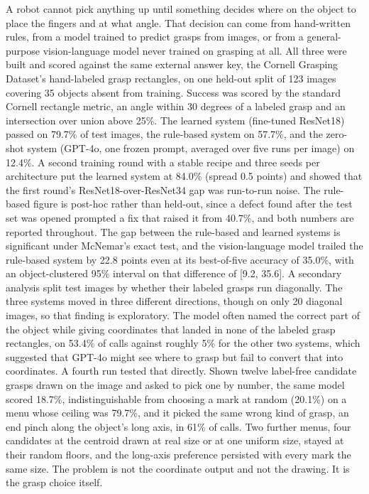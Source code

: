 \documentclass[12pt,letterpaper]{article}
\begin{document}
A robot cannot pick anything up until something decides where on the
object to place the fingers and at what angle. That decision can come
from hand-written rules, from a model trained to predict grasps from
images, or from a general-purpose vision-language model never trained
on grasping at all. All three were built and scored against the same
external answer key, the Cornell Grasping Dataset's hand-labeled grasp
rectangles, on one held-out split of 123 images covering 35 objects
absent from training. Success was scored by the standard Cornell
rectangle metric, an angle within 30 degrees of a labeled grasp and an
intersection over union above 25\%. The learned system (fine-tuned
ResNet18) passed on 79.7\% of test images, the rule-based system on
57.7\%, and the zero-shot system (GPT-4o, one frozen prompt, averaged
over five runs per image) on 12.4\%. A second training round with a
stable recipe and three seeds per architecture put the learned system
at 84.0\% (spread 0.5 points) and showed that the first round's
ResNet18-over-ResNet34 gap was run-to-run noise. The rule-based figure is post-hoc
rather than held-out, since a defect found after the test set was
opened prompted a fix that raised it from 40.7\%, and both numbers are
reported throughout. The gap between the rule-based and learned systems
is significant under McNemar's exact test, and the vision-language
model trailed the rule-based system by 22.8 points even at its
best-of-five accuracy of 35.0\%, with an object-clustered 95\% interval
on that difference of [9.2, 35.6]. A secondary
analysis split test images by whether their labeled grasps run
diagonally. The three systems moved in three different directions,
though on only 20 diagonal images, so that finding is exploratory. The
model often named the correct part of the object while giving
coordinates that landed in none of the labeled grasp rectangles, on
53.4\% of calls against roughly 5\% for the other two systems, which
suggested that GPT-4o might see where to grasp but fail to convert that
into coordinates. A fourth run tested that directly. Shown twelve
label-free candidate grasps drawn on the image and asked to pick one by
number, the same model scored 18.7\%, indistinguishable from choosing a
mark at random (20.1\%) on a menu whose ceiling was 79.7\%, and it
picked the same wrong kind of grasp, an end pinch along the object's
long axis, in 61\% of calls. Two further menus, four candidates at the
centroid drawn at real size or at one uniform size, stayed at their
random floors, and the long-axis preference persisted with every mark
the same size. The problem is not the coordinate output and not the
drawing. It is the grasp choice itself.
\end{document}

